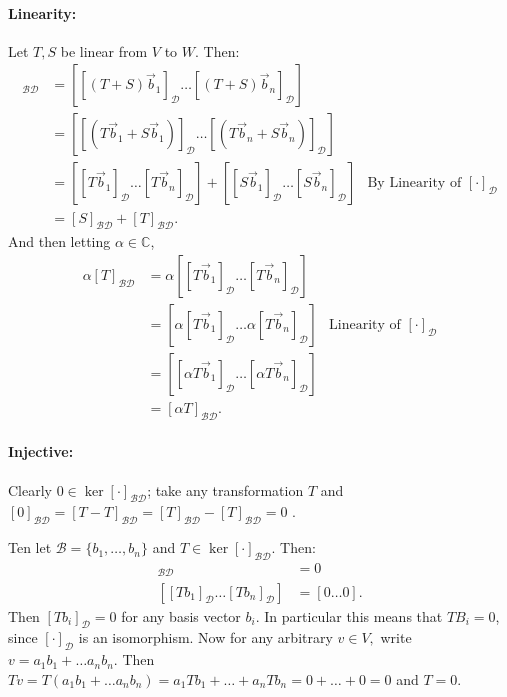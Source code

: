 \documentclass{article}
\begin{document}
\begin{enumerate}
\begin{enumerate}
          \paragraph{Linearity: }Let $T,S$ be linear from $V$ to $W$. Then:
          \begin{align*}
              [T+S]_{\mathcal{B}\mathcal{D}}&= \left[ [(T+S)\vec{b}_1]_\mathcal{D} \ldots [(T+S)\vec{b}_n]_\mathcal{D}  \right] \\
               &= \left[ [(T\vec{b}_1+S\vec{b}_1)]_\mathcal{D} \ldots [(T\vec{b}_n+S\vec{b}_n)]_\mathcal{D}  \right]\\
               &= \left[ [T\vec{b}_1]_\mathcal{D}\ldots [T\vec{b}_n]_\mathcal{D} \right] + \left[ [S\vec{b}_1]_\mathcal{D}\ldots [S\vec{b}_n]_\mathcal{D} \right] &\text{By Linearity of }[\cdot]_\mathcal{D}\\
               &=  [S]_{\mathcal{B}\mathcal{D}} +[T]_{\mathcal{B}\mathcal{D}} 
          .\end{align*}
          And then letting $\alpha\in \mathbb{C}$,
           \begin{align*}
               \alpha[T]_{\mathcal{B}\mathcal{D}}&=\alpha\left[ [T\vec{b}_1]_\mathcal{D}\ldots[T\vec{b}_n]_\mathcal{D} \right] \\
                         &=\left[ \alpha[T\vec{b}_1]_\mathcal{D} \ldots\alpha[T\vec{b}_n]_\mathcal{D}  \right]&\text{Linearity of }[\cdot]_\mathcal{D}\\
                         &=\left[ [\alpha T\vec{b}_1]_\mathcal{D} \ldots[\alpha T\vec{b}_n]_\mathcal{D} \right] \\
               &= [\alpha T]_{\mathcal{B}\mathcal{D}} 
          .\end{align*}
          \paragraph{Injective: } %
          
          Clearly  $0\in \ker[\cdot ]_{\mathcal{BD}}$; take any transformation $T$ and $[0]_{\mathcal{BD}}=[T-T]_{\mathcal{BD}}=[T]_{\mathcal{BD}}-[T]_{\mathcal{BD}}=0$ .

      Ten let $\mathcal{B}=\{b_1,\ldots ,b_n\} $ and $T\in \ker [\cdot ]_\mathcal{BD} $. Then:
      \begin{align*}
          [T]_{\mathcal{BD}}&=0\\
          \left[ [Tb_1]_\mathcal{D}\ldots [Tb_n]_\mathcal{D}\right] &=[0\ldots 0]
      .\end{align*} 
      Then $[Tb_i]_{\mathcal{D}}=0$ for any basis vector $b_i$. In particular this means that $TB_i=0$, since $[\cdot ]_\mathcal{D}$ is an isomorphism. Now for any arbitrary $v\in V,$ write $v=a_1b_1+\ldots a_nb_n$. Then $Tv=T(a_1b_1+\ldots a_n b_n)=a_1Tb_1+\ldots+a_nTb_n=0+\ldots+0=0$ and $T=0$.


\end{enumerate}
\end{enumerate}
\end{document}
